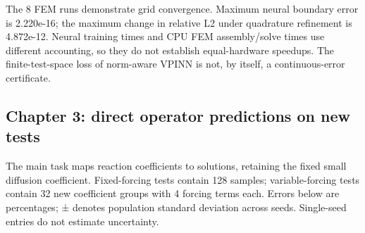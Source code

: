 \documentclass[a4paper,10pt]{article}
\begin{document}
The 8 FEM runs demonstrate grid convergence. Maximum neural boundary error is 2.220e-16; the maximum change in relative L2 under quadrature refinement is 4.872e-12. Neural training times and CPU FEM assembly/solve times use different accounting, so they do not establish equal-hardware speedups. The finite-test-space loss of norm-aware VPINN is not, by itself, a continuous-error certificate.

\subsection{Chapter 3: direct operator predictions on new tests}

The main task maps reaction coefficients to solutions, retaining the fixed small diffusion coefficient. Fixed-forcing tests contain 128 samples; variable-forcing tests contain 32 new coefficient groups with 4 forcing terms each. Errors below are percentages; ± denotes population standard deviation across seeds. Single-seed entries do not estimate uncertainty.
\end{document}
